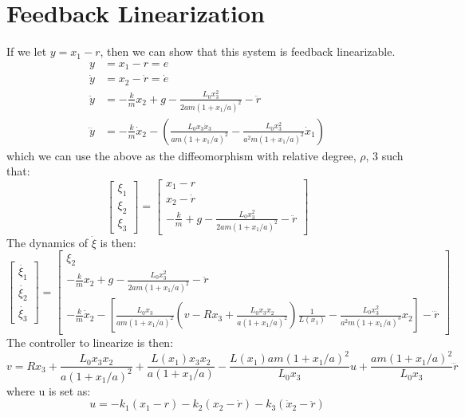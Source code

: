 \documentclass{article}
\begin{document}
\section{Feedback Linearization}
If we let $y = x_1 - r$, then we can show that this system is feedback linearizable.
\begin{align}
    y &= x_1 - r = e \label{eq:y} \\
    \dot{y} &= x_2 - \dot{r} = \dot{e} \label{eq:ydot} \\
    \ddot{y} &= -\frac{k}{m}x_2 + g - \frac{L_0x_3^2}{2am(1 + x_1/a)^2} - \ddot{r} \label{eq:yddot} \\
    \dddot{y} &= -\frac{k}{m}\dot{x}_2 - \left(\frac{L_0x_3\dot{x}_3}{am(1+x_1/a)^2} - \frac{L_0x_3^2}{a^2m(1+x_1/a)^2}\dot{x}_1\right) \label{eq:ydddot}
\end{align}
which we can use the above as the diffeomorphism with relative degree, $\rho$, 3 such that:
\begin{equation}
    \begin{bmatrix}
        \xi_1 \\
        \xi_2 \\
        \xi_3
    \end{bmatrix} =
    \begin{bmatrix}
        x_1 - r \\
        x_2 - \dot{r} \\
        -\frac{k}{m} + g - \frac{L_0x_3^2}{2am(1 + x_1/a)^2} -\ddot{r}
    \end{bmatrix}
\end{equation}
The dynamics of $\dot{\xi}$ is then:
\begin{equation}
    \begin{bmatrix}
        \dot{\xi_1} \\
        \dot{\xi_2} \\
        \dot{\xi_3}
    \end{bmatrix} =
    \begin{bmatrix}
        \xi_2 \\
        -\frac{k}{m}x_2 + g -\frac{L_0x_3^2}{2am(1 + x_1/a)^2} -\ddot{r} \\
        -\frac{k}{m}\dot{x}_2 - \left[\frac{L_0x_3}{am(1 + x_1/a)^2}\left(v - Rx_3 + \frac{L_0x_3x_2}{a(1 + x_1/a)^2}\right)\frac{1}{L(x_1)} - \frac{L_0x_3^2}{a^2m(1 + x_1/a)^3}x_2\right] - \dddot{r}
    \end{bmatrix}
\end{equation}
The controller to linearize is then:
\begin{equation}
    v = Rx_3 + \frac{L_0x_3x_2}{a(1 + x_1/a)^2} + \frac{L(x_1)x_3x_2}{a(1 + x_1/a)} - \frac{L(x_1)am(1 + x_1/a)^2}{L_0x_3}u + \frac{am(1 + x_1/a)^2}{L_0x_3}\dddot{r}
\end{equation}
where u is set as:
\begin{equation}
    u = -k_1(x_1 - r) - k_2(x_2 - \dot{r}) - k_3(\dot{x}_2 - \ddot{r})
\end{equation}
\newpage
\end{document}
